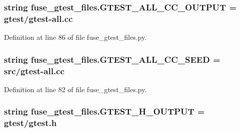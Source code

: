 \subsubsection[{\texorpdfstring{G\+T\+E\+S\+T\+\_\+\+A\+L\+L\+\_\+\+C\+C\+\_\+\+O\+U\+T\+P\+UT}{GTEST_ALL_CC_OUTPUT}}]{\setlength{\rightskip}{0pt plus 5cm}string fuse\+\_\+gtest\+\_\+files.\+G\+T\+E\+S\+T\+\_\+\+A\+L\+L\+\_\+\+C\+C\+\_\+\+O\+U\+T\+P\+UT = \textquotesingle{}gtest/gtest-\/{\bf all.\+cc}\textquotesingle{}}\hypertarget{namespacefuse__gtest__files_aa66c14474599109c46ec24eaa0ad4217}{}\label{namespacefuse__gtest__files_aa66c14474599109c46ec24eaa0ad4217}


Definition at line 86 of file fuse\+\_\+gtest\+\_\+files.\+py.

\subsubsection[{\texorpdfstring{G\+T\+E\+S\+T\+\_\+\+A\+L\+L\+\_\+\+C\+C\+\_\+\+S\+E\+ED}{GTEST_ALL_CC_SEED}}]{\setlength{\rightskip}{0pt plus 5cm}string fuse\+\_\+gtest\+\_\+files.\+G\+T\+E\+S\+T\+\_\+\+A\+L\+L\+\_\+\+C\+C\+\_\+\+S\+E\+ED = \textquotesingle{}src/gtest-\/{\bf all.\+cc}\textquotesingle{}}\hypertarget{namespacefuse__gtest__files_a162a6031d0d5743a37a4f79227d5e916}{}\label{namespacefuse__gtest__files_a162a6031d0d5743a37a4f79227d5e916}


Definition at line 82 of file fuse\+\_\+gtest\+\_\+files.\+py.

\subsubsection[{\texorpdfstring{G\+T\+E\+S\+T\+\_\+\+H\+\_\+\+O\+U\+T\+P\+UT}{GTEST_H_OUTPUT}}]{\setlength{\rightskip}{0pt plus 5cm}string fuse\+\_\+gtest\+\_\+files.\+G\+T\+E\+S\+T\+\_\+\+H\+\_\+\+O\+U\+T\+P\+UT = \textquotesingle{}gtest/{\bf gtest.\+h}\textquotesingle{}}\hypertarget{namespacefuse__gtest__files_a16437f87d0f7a9800885a9082a0b773e}{}\label{namespacefuse__gtest__files_a16437f87d0f7a9800885a9082a0b773e}


